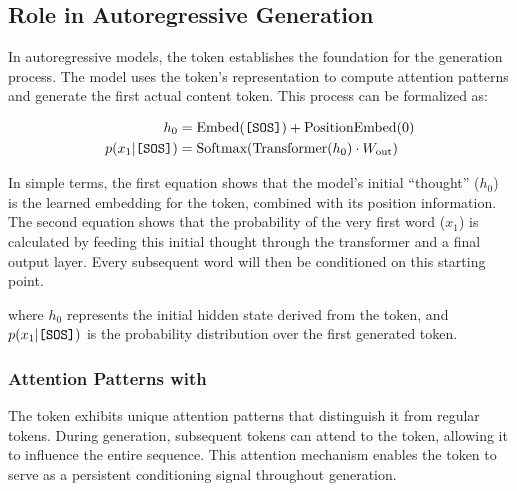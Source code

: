 \subsection{Role in Autoregressive Generation}

In autoregressive models, the \sos{} token establishes the foundation for the generation process. The model uses the \sos{} token's representation to compute attention patterns and generate the first actual content token. This process can be formalized as:

\begin{align}
h_0 &= \text{Embed}(\text{\texttt{[SOS]}{}}) + \text{PositionEmbed}(0) \\
p(x_1 | \text{\texttt{[SOS]}{}}) &= \text{Softmax}(\text{Transformer}(h_0) \cdot W_{\text{out}})
\end{align}

In simple terms, the first equation shows that the model's initial ``thought'' ($h_0$) is the learned embedding for the \sos{} token, combined with its position information. The second equation shows that the probability of the very first word ($x_1$) is calculated by feeding this initial thought through the transformer and a final output layer. Every subsequent word will then be conditioned on this starting point.

where $h_0$ represents the initial hidden state derived from the \sos{} token, and $p(x_1 | \text{\texttt{[SOS]}{}})$ is the probability distribution over the first generated token.

\subsubsection{Attention Patterns with \sos{}}

The \sos{} token exhibits unique attention patterns that distinguish it from regular tokens. During generation, subsequent tokens can attend to the \sos{} token, allowing it to influence the entire sequence. This attention mechanism enables the \sos{} token to serve as a persistent conditioning signal throughout generation.

